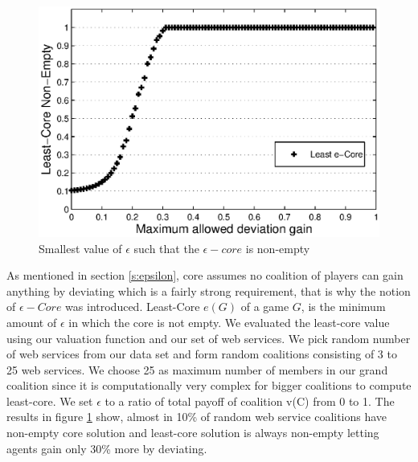 \documentclass[10pt, conference, compsocconf]{IEEEtran}
\theoremstyle{plain}
\theoremstyle{definition}
\begin{document}
\begin{figure}[!t]
\centering
\includegraphics[scale=0.6]{least_core.eps}
\caption{Smallest value of $\epsilon$ such that the $\epsilon-core$ is non-empty} \label{f_leastcore}
\end{figure}

As mentioned in section \ref{s:epsilon}, core assumes no coalition of players can gain anything by deviating which is a fairly strong requirement, that is why the notion of $\epsilon-Core$ was introduced. Least-Core $e(G)$ of a game $G$, is the minimum amount of $\epsilon$ in which the core is not empty. We evaluated the least-core value using our valuation function and our set of web services. We pick random number of web services from our data set and form random coalitions consisting of 3 to 25 web services. We choose 25 as maximum number of members in our grand coalition since it is computationally very complex for bigger coalitions to compute least-core. We set $\epsilon$ to a ratio of total payoff of coalition v(C) from 0 to 1. The results in figure \ref{f_leastcore} show, almost in 10\% of random web service coalitions have non-empty core solution and least-core solution is always non-empty letting agents gain only 30\% more by deviating. 
\end{document}
